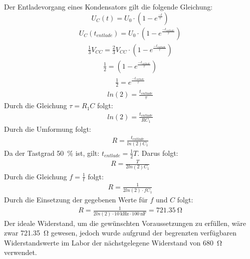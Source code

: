 Der Entladevorgang eines Kondensators gilt die folgende Gleichung:
\begin{equation}
    U_C(t)=U_0 \cdot (1-e^{\frac{-t}{\tau}})
\end{equation}
%
\begin{align*}
    U_C(t_{entlade})=U_0 \cdot (1-e^{\frac{-t_{entlade}}{\tau}})
\end{align*}
%
\begin{align*}
   \frac{1}{3}V_{CC}=  \frac{2}{3}V_{CC} \cdot (1-e^{\frac{-t_{entlade}}{\tau}})
\end{align*}
%
\begin{align*}
   \frac{1}{2} =  (1-e^{\frac{-t_{entlade}}{\tau}})
\end{align*}
%
\begin{align*}
   \frac{1}{2}  = e^{\frac{-t_{entlade}}{\tau}}
\end{align*}
%
\begin{align*}
   ln(2)  = \frac{t_{entlade}}{\tau}
\end{align*}
Durch die Gleichung $\tau=R_1C$ folgt:
\begin{align*}
   ln(2)  = \frac{t_{entlade}}{RC_1}
\end{align*}
Durch die Umformung folgt:
\begin{align*}
  R  = \frac{t_{entlade}}{ln(2)C_1}
\end{align*}
%
Da der Tastgrad \SI{50}{\percent} ist, gilt: $t_{entlade}= \frac{1}{2}T $. Darus folgt:
\begin{align*}
  R  = \frac{T}{2ln(2)C_1}
\end{align*}
Durch die Gleichung $f=\frac{1}{t}$ folgt:
\begin{align*}
  R  = \frac{1}{2ln(2)\cdot fC_1}
\end{align*}
Durch die Einsetzung der gegebenen Werte für $f$ und $C$  folgt:
\begin{align*}
  R  = \frac{1}{2ln(2)\cdot \SI{10}{\kilo\hertz}\cdot \SI{100}{\nano\farad}}=\SI{721,35}{\ohm}
\end{align*}
%
Der ideale Widerstand, um die gewünschten Voraussetzungen zu erfüllen, wäre zwar \SI{721,35}{\ohm} gewesen, jedoch wurde aufgrund der begrenzten verfügbaren Widerstandswerte im Labor der nächstgelegene Widerstand von \SI{680}{\ohm} verwendet.

